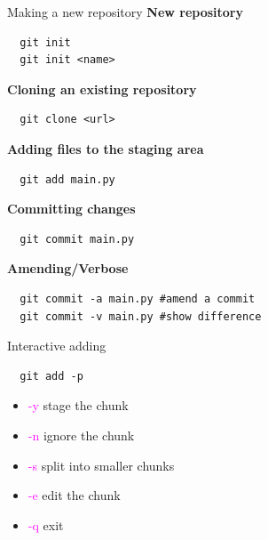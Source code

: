 \documentclass{beamer}
\begin{document}
\begin{frame}[fragile,t]{Making a new repository}
  \textbf{New repository}
  \begin{lstlisting}
  git init
  git init <name>\end{lstlisting}

  \textbf{Cloning an existing repository}
  \begin{lstlisting}
  git clone <url>\end{lstlisting}\pause

  \textbf{Adding files to the staging area}
  \begin{lstlisting}
  git add main.py \end{lstlisting}\pause
  \textbf{Committing changes}
  \begin{lstlisting}
  git commit main.py \end{lstlisting}\pause

  \note{\textcolor{red}{ADD FEATURE TO PYTHON PROGRAM}}

  \textbf{Amending/Verbose}
  \begin{lstlisting}
  git commit -a main.py #amend a commit
  git commit -v main.py #show difference\end{lstlisting}
\end{frame}



\begin{frame}[fragile,t]{Interactive adding}\vspace{10pt}
  \begin{lstlisting}
  git add -p \end{lstlisting}
  \begin{itemize}
    \item \textcolor{magenta}{-y} stage the chunk
    \item \textcolor{magenta}{-n} ignore the chunk
    \item \textcolor{magenta}{-s} split into smaller chunks
    \item \textcolor{magenta}{-e} edit the chunk
    \item \textcolor{magenta}{-q} exit
  \end{itemize}

\end{frame}
\end{document}
